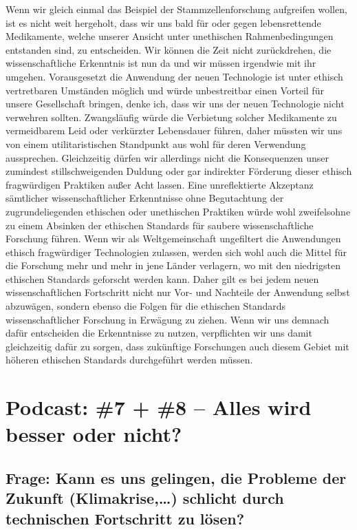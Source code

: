 \documentclass[twoside, a4paper, DIV=11, open=any, bibliography=totoc]{scrbook}
\begin{document}
Wenn wir gleich einmal das Beispiel der Stammzellenforschung aufgreifen wollen,
ist es nicht weit hergeholt, dass wir uns bald für oder gegen lebensrettende Medikamente,
welche unserer Ansicht unter unethischen Rahmenbedingungen entstanden sind, zu entscheiden.
Wir können die Zeit nicht zurückdrehen, die wissenschaftliche Erkenntnis ist nun da
und wir müssen irgendwie mit ihr umgehen. Vorausgesetzt die Anwendung der neuen
Technologie ist unter ethisch vertretbaren Umständen möglich und würde unbestreitbar
einen Vorteil für unsere Gesellschaft bringen, denke ich, dass wir
uns der neuen Technologie nicht verwehren sollten. Zwangsläufig würde die Verbietung
solcher Medikamente zu vermeidbarem Leid oder verkürzter Lebensdauer führen, daher
müssten wir uns von einem utilitaristischen Standpunkt aus wohl für deren Verwendung aussprechen.
Gleichzeitig dürfen wir allerdings nicht die Konsequenzen unser zumindest stillschweigenden
Duldung oder gar indirekter Förderung dieser ethisch fragwürdigen Praktiken außer Acht lassen.
Eine unreflektierte Akzeptanz sämtlicher wissenschaftlicher Erkenntnisse ohne
Begutachtung der zugrundeliegenden ethischen oder unethischen Praktiken würde wohl
zweifelsohne zu einem Absinken der ethischen Standards für saubere wissenschaftliche Forschung führen.
Wenn wir als Weltgemeinschaft ungefiltert die Anwendungen ethisch fragwürdiger Technologien
zulassen, werden sich wohl auch die Mittel für die Forschung mehr und mehr in jene Länder
verlagern, wo mit den niedrigsten ethischen Standards geforscht werden kann.
Daher gilt es bei jedem neuen wissenschaftlichen Fortschritt nicht nur Vor- und Nachteile
der Anwendung selbst abzuwägen, sondern ebenso die Folgen für die ethischen Standards
wissenschaftlicher Forschung in Erwägung zu ziehen.
Wenn wir uns demnach dafür entscheiden die Erkenntnisse zu nutzen, verpflichten
wir uns damit gleichzeitig dafür zu sorgen, dass zukünftige Forschungen auch diesem
Gebiet mit höheren ethischen Standards durchgeführt werden müssen.

\section{Podcast: \#7 + \#8 -- Alles wird besser oder nicht?}

\subsection{Frage: Kann es uns gelingen, die Probleme der Zukunft (Klimakrise,\dots)
schlicht durch technischen Fortschritt zu lösen?}
\end{document}
